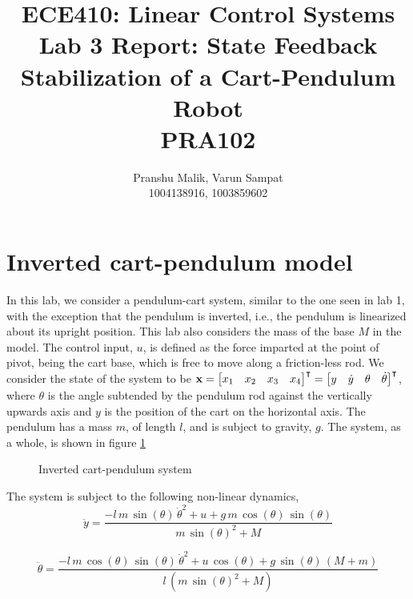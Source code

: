 \documentclass[10pt]{article}
\date{}
\begin{document}
\title{\textbf{\Large{\textsc{ECE410:} Linear Control Systems}} \\ \Large{Lab 3 Report: State Feedback Stabilization of a Cart-Pendulum Robot} \\ \textbf{\small{PRA102}}\vspace{-0.3cm}}
\author{Pranshu Malik, Varun Sampat \\ \footnotesize{1004138916}, \footnotesize{1003859602}\vspace{-3cm}}

\maketitle

\section{Inverted cart-pendulum model}
In this lab, we consider a pendulum-cart system, similar to the one seen in lab 1, with the exception that the pendulum is inverted, i.e., the pendulum is linearized about its upright position. This lab also considers the mass of the base $M$ in the model. The control input, $u$, is defined as the force imparted at the point of pivot, being the cart base, which is free to move along a friction-less rod. We consider the state of the system to be $\mathbf{x} = \begin{bmatrix} x_1 & x_2 & x_3 & x_4 \end{bmatrix}^\intercal = \begin{bmatrix} y & \dot{y} & \theta & \dot{\theta} \end{bmatrix}^\intercal$, where $\theta$ is the angle subtended by the pendulum rod against the vertically upwards axis and $y$ is the position of the cart on the horizontal axis. The pendulum has a mass $m$, of length $l$, and is subject to gravity, $g$. The system, as a whole, is shown in figure \ref{fig:inverted_pend}

\begin{figure}[!h]
\centering
\invertedpendcart
\caption{Inverted cart-pendulum system}
\label{fig:inverted_pend}
\end{figure}

The system is subject to the following non-linear dynamics,
\begin{equation} \label{eqn_y_dot_dot}
    \ddot{y} = \frac{-l\,m\,\sin\left(\theta\right)\,{\dot{\theta}}^2+u+g\,m\,\cos\left(\theta\right)\,\sin\left(\theta\right)}{m\,{\sin\left(\theta\right)}^2+M}
\end{equation}

\begin{equation} \label{eqn_theta_dot_dot}
    \ddot{\theta} = \frac{-l\,m\,\cos\left(\theta\right)\,\sin\left(\theta\right)\,{\dot{\theta}}^2+u\,\cos\left(\theta\right)+g\,\sin\left(\theta\right)\,\left(M+m\right)}{l\,\left(m\,{\sin\left(\theta\right)}^2+M\right)}
\end{equation}
\end{document}
